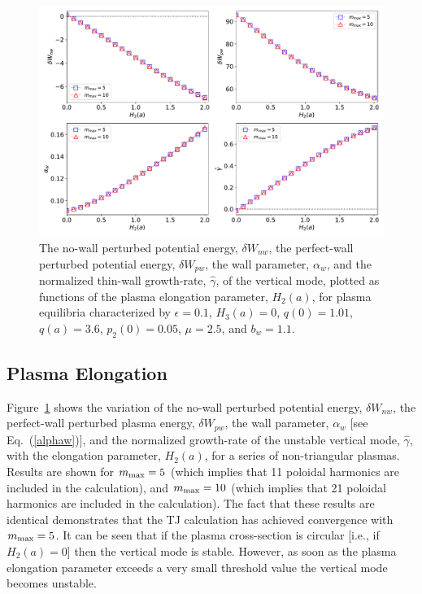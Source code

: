 \documentclass[12pt,prb,aps]{revtex4-1}
\begin{document}
\begin{figure}
\centerline{\includegraphics[width=\textwidth]{Fig1.pdf}}
\caption{The no-wall perturbed potential energy, $\delta W_{nw}$, the perfect-wall perturbed potential energy, $\delta W_{pw}$, the wall
parameter, $\alpha_w$, and the normalized thin-wall growth-rate, $\hat{\gamma}$,  of the  vertical mode, plotted as  functions of the
plasma elongation parameter, $H_2(a)$, for plasma equilibria characterized by  $\epsilon=0.1$, $H_3(a)=0$, $q(0)=1.01$, $q(a)=3.6$,  $p_2(0)=0.05$, $\mu=2.5$, and $b_w=1.1$. \label{fig1}}
\end{figure}

\subsection{Plasma Elongation}
Figure~\ref{fig1} shows the variation of the no-wall perturbed potential energy, $\delta W_{nw}$, the perfect-wall perturbed plasma energy, $\delta W_{pw}$, the wall 
parameter, $\alpha_w$ [see Eq.~(\ref{alphaw})], and the normalized growth-rate of the unstable vertical mode, $\hat{\gamma}$,  with the elongation parameter, $H_2(a)$, for a series of non-triangular plasmas. Results are shown for $m_{\rm max} = 5$ (which implies that 11 poloidal harmonics are included in the calculation), and $m_{\rm max}=10$ 
(which implies that 21  poloidal harmonics are included in the calculation). The fact that these results are identical demonstrates that the TJ calculation has achieved convergence with
$m_{\rm max}=5$. 
It can be seen that if the
plasma cross-section is circular [i.e., if $H_2(a)=0$] then the vertical mode is stable. However, as soon as the plasma elongation parameter exceeds a very small threshold
value the vertical mode becomes unstable.
\end{document}
